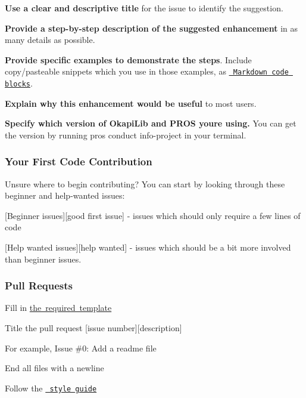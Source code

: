 \begin{DoxyItemize}
\item {\bfseries{Use a clear and descriptive title}} for the issue to identify the suggestion.
\item {\bfseries{Provide a step-\/by-\/step description of the suggested enhancement}} in as many details as possible.
\item {\bfseries{Provide specific examples to demonstrate the steps}}. Include copy/pasteable snippets which you use in those examples, as \href{https://github.com/adam-p/markdown-here/wiki/Markdown-Cheatsheet\#code}{\texttt{ Markdown code blocks}}.
\item {\bfseries{Explain why this enhancement would be useful}} to most users.
\item {\bfseries{Specify which version of Okapi\+Lib and P\+R\+OS you\textquotesingle{}re using.}} You can get the version by running {\ttfamily pros conduct info-\/project} in your terminal.
\end{DoxyItemize}

\subsubsection*{Your First Code Contribution}

Unsure where to begin contributing? You can start by looking through these {\ttfamily beginner} and {\ttfamily help-\/wanted} issues\+:


\begin{DoxyItemize}
\item \mbox{[}Beginner issues\mbox{]}\mbox{[}good first issue\mbox{]} -\/ issues which should only require a few lines of code
\item \mbox{[}Help wanted issues\mbox{]}\mbox{[}help wanted\mbox{]} -\/ issues which should be a bit more involved than {\ttfamily beginner} issues.
\end{DoxyItemize}

\subsubsection*{Pull Requests}


\begin{DoxyItemize}
\item Fill in \mbox{\hyperlink{md_PULL_REQUEST_TEMPLATE}{the required template}}
\item Title the pull request \mbox{[}issue number\mbox{]}\mbox{[}description\mbox{]}
\begin{DoxyItemize}
\item For example, {\ttfamily Issue \#0\+: Add a readme file}
\end{DoxyItemize}
\item End all files with a newline
\item Follow the \href{\#code-styleguide}{\texttt{ style guide}}
\end{DoxyItemize}

